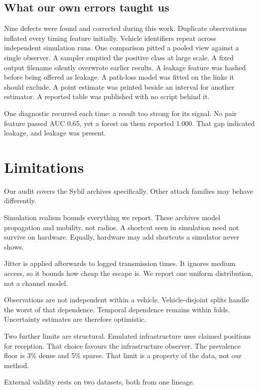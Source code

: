 \documentclass[journal,twoside]{IEEEtran}
\begin{document}
\subsection{What our own errors taught us}

Nine defects were found and corrected during this work.
Duplicate observations inflated every timing feature initially.
Vehicle identifiers repeat across independent simulation runs.
One comparison pitted a pooled view against a single observer.
A sampler emptied the positive class at large scale.
A fixed output filename silently overwrote earlier results.
A leakage feature was hashed before being offered as leakage.
A path-loss model was fitted on the links it should exclude.
A point estimate was printed beside an interval for another estimator.
A reported table was published with no script behind it.

One diagnostic recurred each time: a result too strong for its signal.
No pair feature passed AUC 0.65, yet a forest on them reported 1.000.
That gap indicated leakage, and leakage was present.

\section{Limitations}

Our audit covers the Sybil archives specifically.
Other attack families may behave differently.

Simulation realism bounds everything we report.
These archives model propagation and mobility, not radios.
A shortcut seen in simulation need not survive on hardware.
Equally, hardware may add shortcuts a simulator never shows.

Jitter is applied afterwards to logged transmission times.
It ignores medium access, so it bounds how cheap the escape is.
We report one uniform distribution, not a channel model.

Observations are not independent within a vehicle.
Vehicle-disjoint splits handle the worst of that dependence.
Temporal dependence remains within folds.
Uncertainty estimates are therefore optimistic.

Two further limits are structural.
Emulated infrastructure uses claimed positions for reception.
That choice favours the infrastructure observer.
The prevalence floor is 3\% dense and 5\% sparse.
That limit is a property of the data, not our method.

External validity rests on two datasets, both from one lineage.
\end{document}
